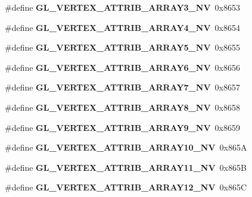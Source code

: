\begin{DoxyCompactItemize}
\item 
\#define {\bfseries G\+L\+\_\+\+V\+E\+R\+T\+E\+X\+\_\+\+A\+T\+T\+R\+I\+B\+\_\+\+A\+R\+R\+A\+Y3\+\_\+\+N\+V}~0x8653\label{_s_d_l__opengl_8h_aff82802cc29b5dee4e80531e5ed02bd9}

\item 
\#define {\bfseries G\+L\+\_\+\+V\+E\+R\+T\+E\+X\+\_\+\+A\+T\+T\+R\+I\+B\+\_\+\+A\+R\+R\+A\+Y4\+\_\+\+N\+V}~0x8654\label{_s_d_l__opengl_8h_a97f6a6cf66a84d42218b11a843a9447e}

\item 
\#define {\bfseries G\+L\+\_\+\+V\+E\+R\+T\+E\+X\+\_\+\+A\+T\+T\+R\+I\+B\+\_\+\+A\+R\+R\+A\+Y5\+\_\+\+N\+V}~0x8655\label{_s_d_l__opengl_8h_a8739e37706cad368fd5784fbf7b72fcd}

\item 
\#define {\bfseries G\+L\+\_\+\+V\+E\+R\+T\+E\+X\+\_\+\+A\+T\+T\+R\+I\+B\+\_\+\+A\+R\+R\+A\+Y6\+\_\+\+N\+V}~0x8656\label{_s_d_l__opengl_8h_a1937170099696dd012902c338accb353}

\item 
\#define {\bfseries G\+L\+\_\+\+V\+E\+R\+T\+E\+X\+\_\+\+A\+T\+T\+R\+I\+B\+\_\+\+A\+R\+R\+A\+Y7\+\_\+\+N\+V}~0x8657\label{_s_d_l__opengl_8h_a91af9bf3adfa445374ca477ac9b17276}

\item 
\#define {\bfseries G\+L\+\_\+\+V\+E\+R\+T\+E\+X\+\_\+\+A\+T\+T\+R\+I\+B\+\_\+\+A\+R\+R\+A\+Y8\+\_\+\+N\+V}~0x8658\label{_s_d_l__opengl_8h_a5ef51a73c1491903cc90bdb02ff18fdd}

\item 
\#define {\bfseries G\+L\+\_\+\+V\+E\+R\+T\+E\+X\+\_\+\+A\+T\+T\+R\+I\+B\+\_\+\+A\+R\+R\+A\+Y9\+\_\+\+N\+V}~0x8659\label{_s_d_l__opengl_8h_a1e22f24af9b348d045d32866ceaddd00}

\item 
\#define {\bfseries G\+L\+\_\+\+V\+E\+R\+T\+E\+X\+\_\+\+A\+T\+T\+R\+I\+B\+\_\+\+A\+R\+R\+A\+Y10\+\_\+\+N\+V}~0x865\+A\label{_s_d_l__opengl_8h_af8898bb67bea879b233a6e55675a9c4e}

\item 
\#define {\bfseries G\+L\+\_\+\+V\+E\+R\+T\+E\+X\+\_\+\+A\+T\+T\+R\+I\+B\+\_\+\+A\+R\+R\+A\+Y11\+\_\+\+N\+V}~0x865\+B\label{_s_d_l__opengl_8h_a4cea5bbb704fb4cca3ad4a31640d45ae}

\item 
\#define {\bfseries G\+L\+\_\+\+V\+E\+R\+T\+E\+X\+\_\+\+A\+T\+T\+R\+I\+B\+\_\+\+A\+R\+R\+A\+Y12\+\_\+\+N\+V}~0x865\+C\label{_s_d_l__opengl_8h_a18d2e2cbfe085148b81ff2d1e8ab8415}


\end{DoxyCompactItemize}

